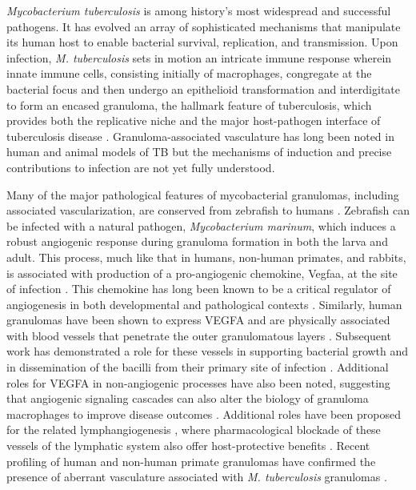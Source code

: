 \textit{Mycobacterium tuberculosis} is among history's most widespread and successful pathogens. It has evolved an array of sophisticated mechanisms that manipulate its human host to enable bacterial survival, replication, and transmission. Upon infection, \textit{M. tuberculosis} sets in motion an intricate immune response wherein innate immune cells, consisting initially of macrophages, congregate at the bacterial focus and then undergo an epithelioid transformation and interdigitate to form an encased granuloma, the hallmark feature of tuberculosis, which provides both the replicative niche and the major host-pathogen interface of tuberculosis disease \citep{Cronan2016, Pagan2018, Cronan2021}. Granuloma-associated vasculature has long been noted in human and animal models of TB \citep{Cudkowicz1952, Russell2010} but the mechanisms of induction and precise contributions to infection are not yet fully understood.

Many of the major pathological features of mycobacterial granulomas, including associated vascularization, are conserved from zebrafish to humans \citep{Swaim2006, Bohrer2021}. Zebrafish can be infected with a natural pathogen, \textit{Mycobacterium marinum}, which induces a robust angiogenic response during granuloma formation in both the larva and adult. This process, much like that in humans, non-human primates, and rabbits, is associated with production of a pro-angiogenic chemokine, Vegfaa, at the site of infection \citep{Oehlers2015}. This chemokine has long been known to be a critical regulator of angiogenesis in both developmental and pathological contexts \citep{Chung2011, Leung1989, Adams2007}. Similarly, human granulomas have been shown to express VEGFA and are physically associated with blood vessels that penetrate the outer granulomatous layers \citep{Datta2015}. Subsequent work has demonstrated a role for these vessels in supporting bacterial growth and in dissemination of the bacilli from their primary site of infection \citep{Polena2016}. Additional roles for VEGFA in non-angiogenic processes have also been noted, suggesting that angiogenic signaling cascades can also alter the biology of granuloma macrophages to improve disease outcomes \citep{Harding2019}. Additional roles have been proposed for the related lymphangiogenesis \citep{Alitalo2005, Duong2012, Lerner2020}, where pharmacological blockade of these vessels of the lymphatic system also offer host-protective benefits \citep{Harding2015}. Recent profiling of human and non-human primate granulomas have confirmed the presence of aberrant vasculature associated with \textit{M. tuberculosis} granulomas \citep{Gideon2022, McCaffrey2022, Cronan2021}.

